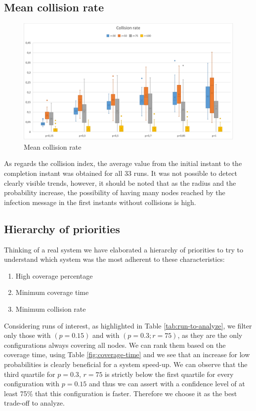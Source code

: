 \subsection{Mean collision rate}

\begin{figure}
\centering
    \includegraphics[width= 1\textwidth]{./images/Collision200Boxplot.png}
    \caption{Mean collision rate}
    \label{fig:mean-collision-rate}
\end{figure}

\noindent As regards the collision index, the average value from the initial instant to the completion instant was obtained for all 33 runs. It was not possible to detect clearly visible trends, however, it should be noted that as the radius and the probability increase, the possibility of having many nodes reached by the infection message in the first instants without collisions is high.

\clearpage 

\subsection{Hierarchy of priorities}
Thinking of a real system we have elaborated a hierarchy of priorities to try to understand which system was the most adherent to these characteristics:

\begin{enumerate}
\item High coverage percentage
\item Minimum coverage time
\item Minimum collision rate
\end{enumerate}

Considering runs of interest, as highlighted in Table \ref{tab:run-to-analyze}, we filter only those with $(p=0.15)$ and with $(p=0.3;r=75)$, as they are the only configurations always covering all nodes.
We can rank them based on the coverage time, using Table \ref{fig:coverage-time} and we see that an increase for low probabilities is clearly beneficial for a system speed-up. We can observe that the third quartile for $p=0.3$, $r=75$ is strictly below the first quartile for every configuration with $p=0.15$ and thus we can assert with a confidence level of at least 75\% that this configuration is faster. Therefore we choose it as the best trade-off to analyze.

